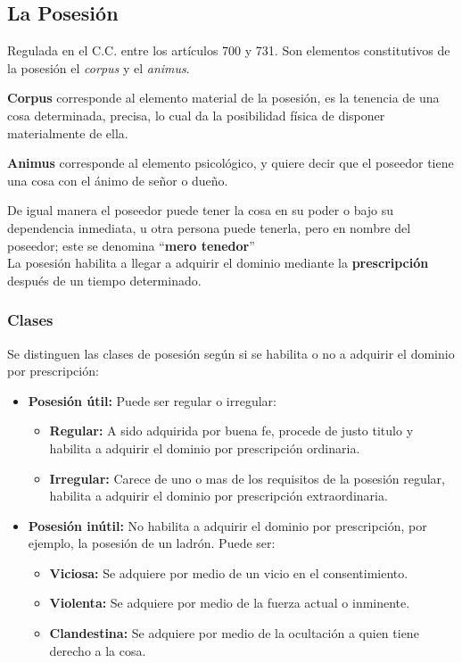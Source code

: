 \documentclass{templateNote}
\begin{document}
\subsection{La Posesión}
\noindent Regulada en el C.C. entre los artículos 700 y 731. Son elementos constitutivos de la posesión el \textit{corpus} y el \textit{animus}.

\textbf{Corpus} corresponde al elemento material de la posesión, es la tenencia de una cosa determinada, precisa, lo cual da la posibilidad física de disponer materialmente de ella.

\textbf{Animus} corresponde al elemento psicológico, y quiere decir que el poseedor tiene una cosa con el ánimo de señor o dueño.

De igual manera el poseedor puede tener la cosa en su poder o bajo su dependencia inmediata, u otra persona puede tenerla, pero en nombre del poseedor; este se denomina “\textbf{mero tenedor}”
\\
La posesión habilita a llegar a adquirir el dominio mediante la \textbf{prescripción} después de un tiempo determinado.

\subsubsection{Clases}
Se distinguen las clases de posesión según si se habilita o no a adquirir el dominio por prescripción:
\begin{itemize}
    \item \textbf{Posesión útil:} Puede ser regular o irregular:
    \begin{itemize}
        \item \textbf{Regular:} A sido adquirida por buena fe, procede de justo titulo y habilita a adquirir el dominio por prescripción ordinaria.
        \item \textbf{Irregular:} Carece de uno o mas de los requisitos de la posesión regular, habilita a adquirir el dominio por prescripción extraordinaria.
    \end{itemize}
    \item \textbf{Posesión inútil:} No habilita a adquirir el dominio por prescripción, por ejemplo, la posesión de un ladrón. Puede ser:
    \begin{itemize}
        \item \textbf{Viciosa:} Se adquiere por medio de un vicio en el consentimiento.
        \item \textbf{Violenta:} Se adquiere por medio de la fuerza actual o inminente.
        \item \textbf{Clandestina:} Se adquiere por medio de la ocultación a quien tiene derecho a la cosa.
    \end{itemize}
\end{itemize}
\end{document}
